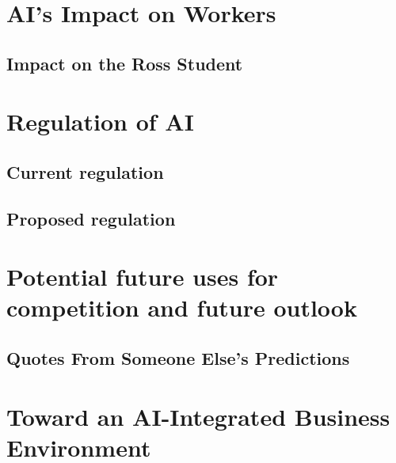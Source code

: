 \documentclass[
]{book}
\begin{document}
\hypertarget{ais-impact-on-workers}{%
\chapter{AI's Impact on Workers}\label{ais-impact-on-workers}}

\hypertarget{impact-on-the-ross-student}{%
\section{Impact on the Ross Student}\label{impact-on-the-ross-student}}

\hypertarget{regulation-of-ai}{%
\chapter{Regulation of AI}\label{regulation-of-ai}}

\hypertarget{current-regulation}{%
\section{Current regulation}\label{current-regulation}}

\hypertarget{proposed-regulation}{%
\section{Proposed regulation}\label{proposed-regulation}}

\hypertarget{potential-future-uses-for-competition-and-future-outlook}{%
\chapter{Potential future uses for competition and future outlook}\label{potential-future-uses-for-competition-and-future-outlook}}

\hypertarget{quotes-from-someone-elses-predictions}{%
\section{Quotes From Someone Else's Predictions}\label{quotes-from-someone-elses-predictions}}

\hypertarget{toward-an-ai-integrated-business-environment}{%
\chapter{Toward an AI-Integrated Business Environment}\label{toward-an-ai-integrated-business-environment}}
\end{document}
